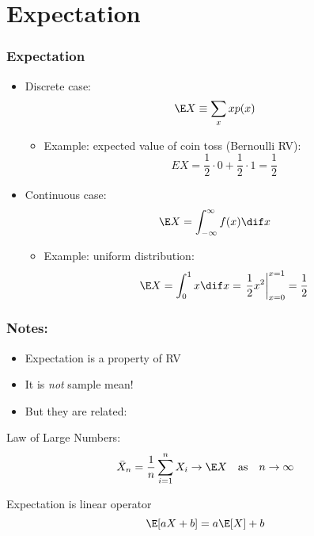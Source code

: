 \documentclass[mathserif, xcolor=table, svgnames]{beamer}
\begin{document}
\section{Expectation}

\begin{frame}
  \frametitle{Expectation}
  \begin{itemize}
  \item Discrete case:
    \begin{equation*}
      \E X \equiv \sum_{x} x p(x)
    \end{equation*}
    \begin{itemize}
    \item Example: expected value of coin toss (Bernoulli RV):
      \begin{equation*}
        E X = \frac{1}{2} \cdot 0 +
        \frac{1}{2} \cdot 1
        = \frac{1}{2}
      \end{equation*}
    \end{itemize}
  \item Continuous case:
    \begin{equation*}
      \E X = \int_{-\infty}^{\infty} f(x) \dif x
    \end{equation*}
    \begin{itemize}
    \item Example: uniform distribution:
      \begin{equation*}
        \E X = \int_0^{1} x \dif x
        =
        \left. \frac{1}{2} x^{2} 
      \right|_{x=0}^{x=1}
      = \frac{1}{2}
      \end{equation*}
    \end{itemize}
  \end{itemize}
\end{frame}

\begin{frame}
  \frametitle{Notes:}
  \begin{itemize}
  \item Expectation is a property of RV
  \item It is \emph{not} sample mean!
  \item But they are related:
  \end{itemize}
  \begin{theorem}
    Law of Large Numbers:
    \begin{equation*}
      \bar X_{n} = \frac{1}{n} \sum_{i=1}^{n} X_{i}
      \rightarrow \E X
      \quad\text{as}\quad
      n \rightarrow \infty
    \end{equation*}
  \end{theorem}
  \begin{theorem}
    Expectation is linear operator
    \begin{equation*}
      \E [aX + b] = a\E[X] + b
    \end{equation*}
  \end{theorem}
\end{frame}
\end{document}
